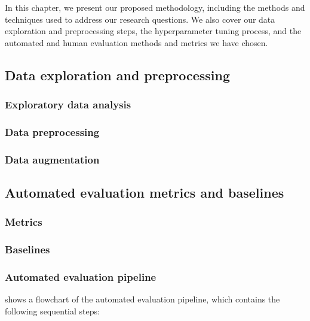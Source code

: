 In this chapter, we present our proposed methodology, including the methods and techniques used to address our research questions. We also cover our data exploration and preprocessing steps, the hyperparameter tuning process, and the automated and human evaluation methods and metrics we have chosen.

\subsection{Data exploration and preprocessing}
\subsubsection{Exploratory data analysis}

\subsubsection{Data preprocessing}

\subsubsection{Data augmentation}


\subsection{Automated evaluation metrics and baselines}
\subsubsection{Metrics}

\subsubsection{Baselines}

\subsubsection{Automated evaluation pipeline}

 shows a flowchart of the automated evaluation pipeline, which contains the following sequential steps:

